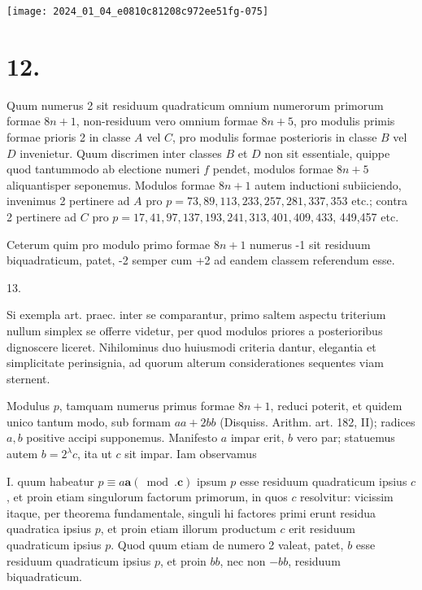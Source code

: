 \documentclass[10pt]{article}
\begin{document}
\begin{center}
\texttt{[image: 2024\_01\_04\_e0810c81208c972ee51fg-075]}
\end{center}

\section*{12.}
Quum numerus 2 sit residuum quadraticum omnium numerorum primorum formae \(8 n+1\), non-residuum vero omnium formae \(8 n+5\), pro modulis primis formae prioris 2 in classe \(A\) vel \(C\), pro modulis formae posterioris in classe \(B\) vel \(D\) invenietur. Quum discrimen inter classes \(B\) et \(D\) non sit essentiale, quippe quod tantummodo ab electione numeri \(f\) pendet, modulos formae \(8 n+5\) aliquantisper seponemus. Modulos formae \(8 n+1\) autem inductioni subiiciendo, invenimus 2 pertinere ad \(A\) pro \(p=73,89,113,233,257,281,337,353\) etc.; contra 2 pertinere ad \(C\) pro \(p=17,41,97,137,193,241,313,401,409,433\), 449,457 etc.

Ceterum quim pro modulo primo formae \(8 n+1\) numerus -1 sit residuum biquadraticum, patet, -2 semper cum +2 ad eandem classem referendum esse.

13.

Si exempla art. praec. inter se comparantur, primo saltem aspectu triterium nullum simplex se offerre videtur, per quod modulos priores a posterioribus dignoscere liceret. Nihilominus duo huiusmodi criteria dantur, elegantia et simplicitate perinsignia, ad quorum alterum considerationes sequentes viam sternent.

Modulus \(p\), tamquam numerus primus formae \(8 n+1\), reduci poterit, et quidem unico tantum modo, sub formam \(a a+2 b b\) (Disquiss. Arithm. art. 182, II); radices \(a, b\) positive accipi supponemus. Manifesto \(a\) impar erit, \(b\) vero par; statuemus autem \(b=2^{\lambda} c\), ita ut \(c\) sit impar. Iam observamus

I. quum habeatur \(p \equiv a \boldsymbol{a}(\bmod . \boldsymbol{c})\) ipsum \(p\) esse residuum quadraticum ipsius \(c\), et proin etiam singulorum factorum primorum, in quos \(c\) resolvitur: vicissim itaque, per theorema fundamentale, singuli hi factores primi erunt residua quadratica ipsius \(p\), et proin etiam illorum productum \(c\) erit residuum quadraticum ipsius \(p\). Quod quum etiam de numero 2 valeat, patet, \(b\) esse residuum quadraticum ipsius \(p\), et proin \(b b\), nec non \(-b b\), residuum biquadraticum.
\end{document}
